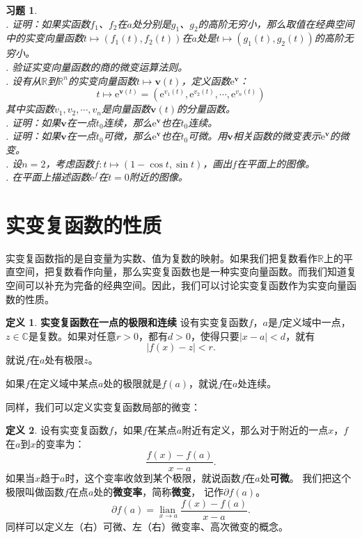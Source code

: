 \documentclass[12pt,UTF8]{ctexbook}
\newcommand{\e}{\mathrm{e}}
\newcommand{\lian}[1]{
    \underset{#1}{\operatorname{lian}\,}
}
\theoremstyle{definition}
\newtheorem{df}{定义}[section]
\theoremstyle{plain}
\newtheorem{xt}{习题}[section]
\begin{document}
\begin{xt}
    \mbox{} \\
    . 证明：如果实函数$f_1$、$f_2$在$a$处分别是$g_1$、$g_2$的高阶无穷小，那么取值在经典空间中的实变向量函数$t\mapsto (f_1(t), f_2(t))$在$a$处是$t\mapsto (g_1(t), g_2(t))$的高阶无穷小。\\
    . 验证实变向量函数的商的微变运算法则。\\
    . 设有从$\mathbb{R}$到$\mathbb{R}^n$的实变向量函数$t\mapsto \mathbf{v}(t)$，定义函数$\e^{\mathbf{v}}$：
    $$ t\mapsto \e^{\mathbf{v}(t)} = \left(\e^{v_1(t)}, \e^{v_2(t)}, \cdots , \e^{v_n(t)}\right)$$
    其中实函数$v_1, v_2, \cdots, v_n$是向量函数$\mathbf{v}(t)$的分量函数。\\
    . 证明：如果$\mathbf{v}$在一点$t_0$连续，那么$\e^{\mathbf{v}}$也在$t_0$连续。\\
    . 证明：如果$\mathbf{v}$在一点$t_0$可微，那么$\e^{\mathbf{v}}$也在$t_0$可微。用$\mathbf{v}$相关函数的微变表示$\e^{\mathbf{v}}$的微变。\\
    . 设$n=2$，考虑函数$f: t\mapsto (1 - \cos{t}, \sin{t})$，画出$f$在平面上的图像。\\
    . 在平面上描述函数$\e^f$在$t=0$附近的图像。
\end{xt}

\section{实变复函数的性质}

实变复函数指的是自变量为实数、值为复数的映射。如果我们把复数看作$\mathbb{R}$上的平直空间，把复数看作向量，那么实变复函数也是一种实变向量函数。而我们知道复空间可以补充为完备的经典空间。因此，我们可以讨论实变复函数作为实变向量函数的性质。

\begin{df}{\textbf{实变复函数在一点的极限和连续}}
    设有实变复函数$f$，$a$是$f$定义域中一点，$z\in\mathbb{C}$是复数。如果对任意$r>0$，都有$d>0$，使得只要$|x - a| < d$，就有
    $$|f(x) - z| < r.$$
    就说$f$在$a$处有极限$z$。

    如果$f$在定义域中某点$a$处的极限就是$f(a)$，就说$f$在$a$处连续。
\end{df}

同样，我们可以定义实变复函数局部的微变：
\begin{df}
    设有实变复函数$f$，如果$f$在某点$a$附近有定义，那么对于附近的一点$x$，$f$在$a$到$x$的变率为：
    $$ \frac{f(x) - f(a)}{x - a}.$$
    如果当$x$趋于$a$时，这个变率收敛到某个极限，就说函数$f$在$a$处\textbf{可微}。
    我们把这个极限叫做函数$f$在点$a$处的\textbf{微变率}，简称\textbf{微变}，
    记作$\partial f(a)$。
    $$ \partial f(a) = \lian{{x\to a}} \frac{f(x) - f(a)}{x - a}. $$
    同样可以定义左（右）可微、左（右）微变率、高次微变的概念。
\end{df}
\end{document}
